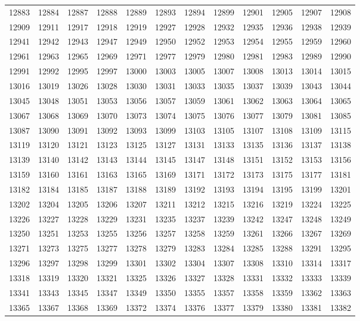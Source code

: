 \begin{center}
\begin{longtable}{llllllllllll}
12883 &12884 &12887 &12888 &12889 &12893 &12894 &12899 &12901 &12905 &12907 &12908 \\
12909 &12911 &12917 &12918 &12919 &12927 &12928 &12932 &12935 &12936 &12938 &12939 \\
12941 &12942 &12943 &12947 &12949 &12950 &12952 &12953 &12954 &12955 &12959 &12960 \\
12961 &12963 &12965 &12969 &12971 &12977 &12979 &12980 &12981 &12983 &12989 &12990 \\
12991 &12992 &12995 &12997 &13000 &13003 &13005 &13007 &13008 &13013 &13014 &13015 \\
13016 &13019 &13026 &13028 &13030 &13031 &13033 &13035 &13037 &13039 &13043 &13044 \\
13045 &13048 &13051 &13053 &13056 &13057 &13059 &13061 &13062 &13063 &13064 &13065 \\
13067 &13068 &13069 &13070 &13073 &13074 &13075 &13076 &13077 &13079 &13081 &13085 \\
13087 &13090 &13091 &13092 &13093 &13099 &13103 &13105 &13107 &13108 &13109 &13115 \\
13119 &13120 &13121 &13123 &13125 &13127 &13131 &13133 &13135 &13136 &13137 &13138 \\
13139 &13140 &13142 &13143 &13144 &13145 &13147 &13148 &13151 &13152 &13153 &13156 \\
13159 &13160 &13161 &13163 &13165 &13169 &13171 &13172 &13173 &13175 &13177 &13181 \\
13182 &13184 &13185 &13187 &13188 &13189 &13192 &13193 &13194 &13195 &13199 &13201 \\
13202 &13204 &13205 &13206 &13207 &13211 &13212 &13215 &13216 &13219 &13224 &13225 \\
13226 &13227 &13228 &13229 &13231 &13235 &13237 &13239 &13242 &13247 &13248 &13249 \\
13250 &13251 &13253 &13255 &13256 &13257 &13258 &13259 &13261 &13266 &13267 &13269 \\
13271 &13273 &13275 &13277 &13278 &13279 &13283 &13284 &13285 &13288 &13291 &13295 \\
13296 &13297 &13298 &13299 &13301 &13302 &13304 &13307 &13308 &13310 &13314 &13317 \\
13318 &13319 &13320 &13321 &13325 &13326 &13327 &13328 &13331 &13332 &13333 &13339 \\
13341 &13343 &13345 &13347 &13349 &13350 &13355 &13357 &13358 &13359 &13362 &13363 \\
13365 &13367 &13368 &13369 &13372 &13374 &13376 &13377 &13379 &13380 &13381 &13382 \\

\end{longtable}
\end{center}
